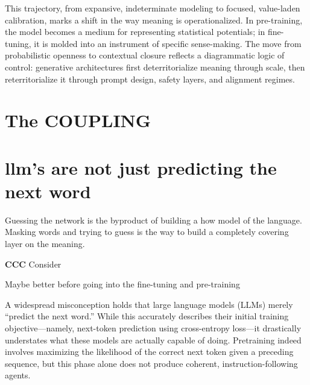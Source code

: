This trajectory, from expansive, indeterminate modeling to focused, value-laden calibration, marks a shift in the way meaning is operationalized. In pre-training, the model becomes a medium for representing statistical potentials; in fine-tuning, it is molded into an instrument of specific sense-making. The move from probabilistic openness to contextual closure reflects a diagrammatic logic of control: generative architectures first deterritorialize meaning through scale, then reterritorialize it through prompt design, safety layers, and alignment regimes.

\medskip

\section{The COUPLING}


\section{\gls{llm}'s are not just predicting the next word }

Guessing the network is the byproduct of building a how model of the language.
Masking words and trying to guess is the way to build a completely covering
layer on the meaning.

\begin{orangebox}
	\textbf{CCC} Consider

	Maybe better before going into the fine-tuning and pre-training
\end{orangebox}

A widespread misconception holds that large language models (LLMs) merely “predict the next word.” While this accurately describes their initial training objective—namely, next-token prediction using cross-entropy loss—it drastically understates what these models are actually capable of doing. Pretraining indeed involves maximizing the likelihood of the correct next token given a preceding sequence, but this phase alone does not produce coherent, instruction-following agents.

